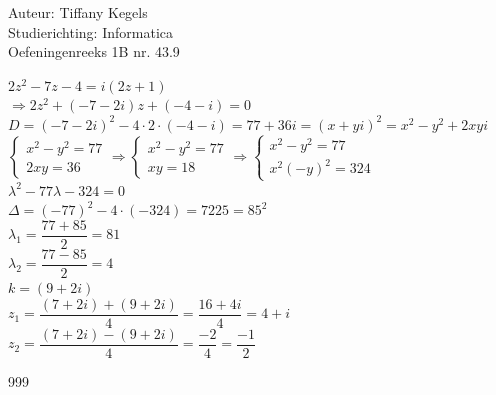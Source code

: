 \documentclass[a4paper]{article}
\begin{document}
  
\noindent \large Auteur: Tiffany Kegels \\
\noindent \large Studierichting: Informatica\\
\noindent \large Oefeningenreeks 1B nr. 43.9\\

\medskip

\normalsize

$2z^2 - 7z -4 = i(2z+1)$\\

$\Rightarrow 2z^2 + (-7-2i)z + (-4-i) = 0$\\

$D = (-7-2i)^2 - 4 \cdot 2 \cdot(-4-i) = 77 + 36i = (x+yi)^2 = x^2 - y^2 + 2xyi$\\

$\left\{
	\begin{array}{l} 
		x^2 - y^2 = 77\\
		2xy = 36
	\end{array}
\right .
\Rightarrow
\left\{
	\begin{array}{l} 
		x^2 - y^2 = 77\\
		xy = 18
	\end{array}
\right .
\Rightarrow
\left\{
	\begin{array}{l} 
		x^2 - y^2 = 77\\
		x^2(-y)^2 = 324
	\end{array}
\right .$\\

$\lambda^2 -77\lambda - 324 = 0$\\

$\Delta = (-77)^2 -4\cdot(-324) = 7225 = 85^2$\\

$\lambda_1 = \dfrac{77 +85}{2} = 81$\\

$\lambda_2 = \dfrac{77-85}{2} = 4$\\

$k = (9+2i)$\\

$z_1 = \dfrac{(7+2i) + (9+2i)}{4} = \dfrac{16+4i}{4} = 4+i$\\

$z_2 = \dfrac{(7 +2i) - (9+2i)}{4} = \dfrac{-2}{4} = \dfrac{-1}{2}$\\

\begin{thebibliography}{999}

\end{thebibliography}
\end{document}
